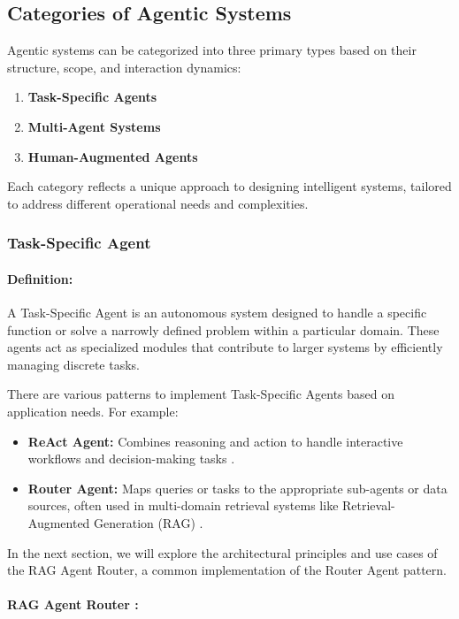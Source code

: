 \documentclass[12pt]{article}
\begin{document}
\newpage
\subsection{Categories of Agentic Systems}
Agentic systems can be categorized into three primary types based on their structure, scope, and interaction dynamics:
\begin{enumerate}
    \item \textbf{Task-Specific Agents}
    \item \textbf{Multi-Agent Systems}
    \item \textbf{Human-Augmented Agents}
\end{enumerate}
Each category reflects a unique approach to designing intelligent systems, tailored to address different operational needs and complexities.

\subsubsection{Task-Specific Agent}
\paragraph{Definition:}
A Task-Specific Agent is an autonomous system designed to handle a specific function or solve a narrowly defined problem within a particular domain. These agents act as specialized modules that contribute to larger systems by efficiently managing discrete tasks.

There are various patterns to implement Task-Specific Agents based on application needs. For example:
\begin{itemize}
    \item \textbf{ReAct Agent:} Combines reasoning and action to handle interactive workflows and decision-making tasks \cite{ReAct2022}.
    \item \textbf{Router Agent:} Maps queries or tasks to the appropriate sub-agents or data sources, often used in multi-domain retrieval systems like Retrieval-Augmented Generation (RAG) \cite{SRSA2024}.
\end{itemize}

In the next section, we will explore the architectural principles and use cases of the RAG Agent Router, a common implementation of the Router Agent pattern.

\newpage
\paragraph{RAG Agent Router :}
\end{document}
